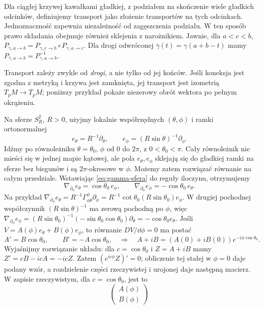 Dla ciągłej krzywej kawałkami gładkiej, z podziałem na
skończenie wiele gładkich odcinków, definiujemy transport
jako złożenie transportów na tych odcinkach. Jednoznaczność
zapewnia niezależność od zagęszczenia podziału. W ten sposób
prawo składania obejmuje również sklejenia z narożnikiem.
Jawnie, dla $a<c<b$,
$P_{\gamma,a\to b}
=P_{\gamma,c\to b}\circ P_{\gamma,a\to c}$.
Dla drogi odwróconej $\bar\gamma(t)=\gamma(a+b-t)$
mamy $P_{\bar\gamma,a\to b}=P_{\gamma,a\to b}^{-1}$.

Transport zależy zwykle od \emph{drogi}, a nie
tylko od jej końców. Jeśli koneksja jest zgodna z metryką
i krzywa jest zamknięta, jej transport jest izometrią
$T_pM\to T_pM$;
poniższy przykład pokaże niezerowy obrót
wektora po pełnym okrążeniu.

\begin{przyklad}
\label{prz:transport-sfera}
Na sferze $S_R^2$, $R>0$, użyjmy lokalnie współrzędnych
$(\theta,\phi)$ i ramki ortonormalnej
\[
 e_\theta=R^{-1}\partial_\theta,
 \qquad e_\phi=(R\sin\theta)^{-1}\partial_\phi.
\]
Idźmy po równoleżniku $\theta=\theta_0$,
$\phi$ od $0$ do $2\pi$, z $0<\theta_0<\pi$.
Cały równoleżnik nie mieści się w jednej mapie kątowej,
ale pola $e_\theta,e_\phi$ sklejają się do gładkiej ramki
na sferze bez biegunów i są $2\pi$-okresowe w $\phi$.
Możemy zatem rozwiązać równanie na całym przedziale.
Wstawiając \eqref{eq:gamma-sfera} do reguły
iloczynu, otrzymujemy
\[
 \nabla_{\partial_\phi}e_\theta
   =\cos\theta_0\,e_\phi,
 \qquad
 \nabla_{\partial_\phi}e_\phi
   =-\cos\theta_0\,e_\theta.
\]
Na przykład
$\nabla_{\partial_\phi}e_\theta
=R^{-1}\Gamma^\phi_{\phi\theta}\partial_\phi
=R^{-1}\cot\theta_0(R\sin\theta_0)e_\phi$.
W drugiej pochodnej współczynnik $(R\sin\theta)^{-1}$
ma zerową pochodną po $\phi$, więc
$\nabla_{\partial_\phi}e_\phi
=(R\sin\theta_0)^{-1}(-\sin\theta_0\cos\theta_0)
\partial_\theta=-\cos\theta_0e_\theta$.
Jeśli $V=A(\phi)e_\theta+B(\phi)e_\phi$,
to równanie $DV/\dd\phi=0$ ma postać
\[
 A'=B\cos\theta_0,
 \qquad B'=-A\cos\theta_0,
 \quad\Longrightarrow\quad
 A+iB=(A(0)+iB(0))e^{-i\phi\cos\theta_0}.
\]
Wyjaśnijmy rozwiązanie układu: dla $c=\cos\theta_0$
i $Z=A+iB$ mamy $Z'=cB-icA=-icZ$.
Zatem $(e^{ic\phi}Z)'=0$; obliczenie tej stałej w $\phi=0$
daje podany wzór, a rozdzielenie części rzeczywistej
i urojonej daje następną macierz.
W zapisie rzeczywistym, dla $c=\cos\theta_0$, jest to
\[
 \begin{pmatrix}A(\phi)\\B(\phi)\end{pmatrix}
\]
\end{przyklad}
